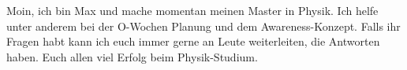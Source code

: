 \begin{multicols}{2}

\vspace{-0.1cm}

{
Moin, ich bin Max und mache momentan meinen Master in Physik. Ich helfe unter anderem bei der O-Wochen Planung und dem Awareness-Konzept. Falls ihr Fragen habt kann ich euch immer gerne an Leute weiterleiten, die Antworten haben. Euch allen viel Erfolg beim Physik-Studium. 
}


\end{multicols}
